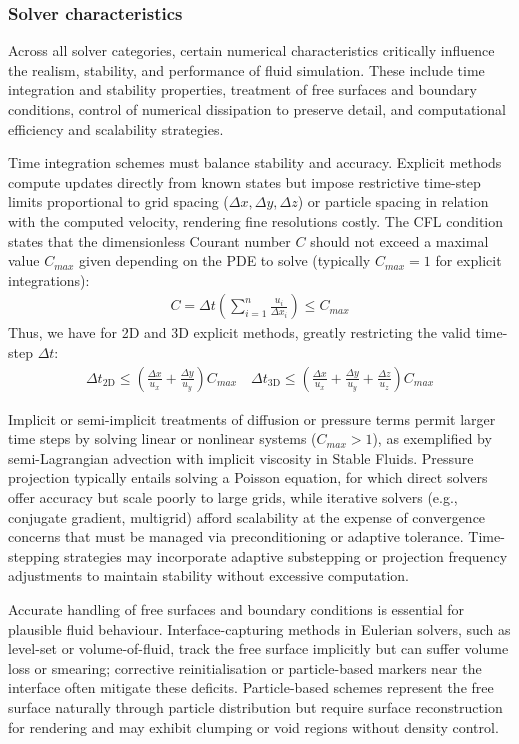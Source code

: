 \subsubsection{Solver characteristics}

Across all solver categories, certain numerical characteristics critically influence the realism, stability, and performance of fluid simulation. These include time integration and stability properties, treatment of free surfaces and boundary conditions, control of numerical dissipation to preserve detail, and computational efficiency and scalability strategies.

Time integration schemes must balance stability and accuracy. Explicit methods compute updates directly from known states but impose restrictive time-step limits proportional to grid spacing ($\Delta x, \Delta y, \Delta z$) or particle spacing in relation with the computed velocity, rendering fine resolutions costly. The CFL condition states that the dimensionless Courant number $C$ should not exceed a maximal value $C_{max}$ given depending on the PDE to solve (typically $C_{max} = 1$ for explicit integrations):
\begin{align}
    C = \Delta t \left( \sum_{i=1}^{n}{\frac{u_i}{\Delta x_i}} \right) \leq C_{max} \nonumber
\end{align}
Thus, we have for 2D and 3D explicit methods, greatly restricting the valid time-step $\Delta t$:
\begin{align}
    \Delta t_{\text{2D}} \leq \left( \frac{\Delta x}{u_x} + \frac{\Delta y}{u_y} \right) C_{max}
    \quad
    \Delta t_{\text{3D}} \leq \left( \frac{\Delta x}{u_x} + \frac{\Delta y}{u_y} + \frac{\Delta z}{u_z} \right) C_{max}
\end{align}

Implicit or semi-implicit treatments of diffusion or pressure terms permit larger time steps by solving linear or nonlinear systems ($C_{max} > 1$), as exemplified by semi-Lagrangian advection with implicit viscosity in Stable Fluids. Pressure projection typically entails solving a Poisson equation, for which direct solvers offer accuracy but scale poorly to large grids, while iterative solvers (e.g., conjugate gradient, multigrid) afford scalability at the expense of convergence concerns that must be managed via preconditioning or adaptive tolerance. Time-stepping strategies may incorporate adaptive substepping or projection frequency adjustments to maintain stability without excessive computation.

Accurate handling of free surfaces and boundary conditions is essential for plausible fluid behaviour. Interface-capturing methods in Eulerian solvers, such as level-set or volume-of-fluid, track the free surface implicitly but can suffer volume loss or smearing; corrective reinitialisation or particle-based markers near the interface often mitigate these deficits. Particle-based schemes represent the free surface naturally through particle distribution but require surface reconstruction for rendering and may exhibit clumping or void regions without density control. 

